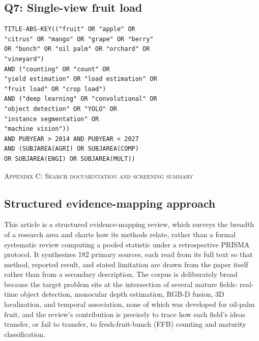 \subsection*{Q7: Single-view fruit load}
\begin{verbatim}
TITLE-ABS-KEY(("fruit" OR "apple" OR
"citrus" OR "mango" OR "grape" OR "berry"
OR "bunch" OR "oil palm" OR "orchard" OR
"vineyard")
AND ("counting" OR "count" OR
"yield estimation" OR "load estimation" OR
"fruit load" OR "crop load")
AND ("deep learning" OR "convolutional" OR
"object detection" OR "YOLO" OR
"instance segmentation" OR
"machine vision"))
AND PUBYEAR > 2014 AND PUBYEAR < 2027
AND (SUBJAREA(AGRI) OR SUBJAREA(COMP)
OR SUBJAREA(ENGI) OR SUBJAREA(MULT))
\end{verbatim}


\begin{center}
\textsc{Appendix C: Search documentation and screening summary}
\end{center}

\subsection{Structured evidence-mapping approach}

This article is a structured evidence-mapping review, which surveys the breadth of a research area and charts how its methods relate, rather than a formal systematic review computing a pooled statistic under a retrospective PRISMA protocol. It synthesizes 182 primary sources, each read from its full text so that method, reported result, and stated limitation are drawn from the paper itself rather than from a secondary description. The corpus is deliberately broad because the target problem sits at the intersection of several mature fields: real-time object detection, monocular depth estimation, RGB-D fusion, 3D localization, and temporal association, none of which was developed for oil-palm fruit, and the review's contribution is precisely to trace how each field's ideas transfer, or fail to transfer, to fresh-fruit-bunch (FFB) counting and maturity classification.

